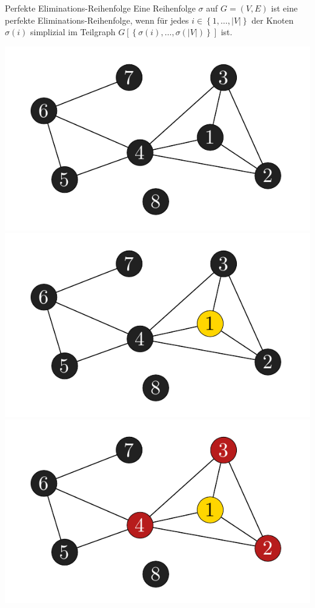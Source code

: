 \documentclass[xcolor=x11names,compress]{beamer}
\begin{document}
\begin{frame}
	\begin{block}{Perfekte Eliminations-Reihenfolge}
		Eine Reihenfolge \( \sigma \) auf \( G = \left( V, E \right) \) ist eine perfekte Eliminations-Reihenfolge, wenn für jedes \( i \in \left\lbrace 1, \ldots, \left| V \right| \right\rbrace \) der Knoten \( \sigma \left( i \right) \) simplizial im Teilgraph \( G \left[ \left\lbrace \sigma \left( i \right), \ldots, \sigma \left( \left| V \right| \right) \right\rbrace \right] \) ist.
	\end{block}
	\begin{center}
		\begin{overprint}
			\includegraphics[scale=1.0]{img/graph/peo/01.pdf}
			\onslide<2>\includegraphics[scale=1.0]{img/graph/peo/02.pdf}
			\onslide<3>\includegraphics[scale=1.0]{img/graph/peo/03.pdf}

\end{overprint}
\end{center}
\end{frame}
\end{document}
